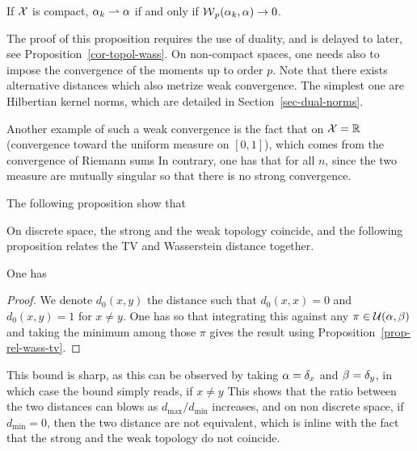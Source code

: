 \begin{prop}
	If $\mathcal{X}$ is compact, $\alpha_k \rightharpoonup \alpha$ if and only if $\operatorname{\mathcal{W}}_p(\alpha_k,\alpha) \rightarrow 0$. 
\end{prop}

The proof of this proposition requires the use of duality, and is delayed to later, see Proposition~\ref{cor-topol-wass}. 
On non-compact spaces, one needs also to impose the convergence of the moments up to order $p$.
%
Note that there exists alternative distances which also metrize weak convergence. The simplest one are Hilbertian kernel norms, which are detailed in Section~\ref{sec-dual-norms}.

Another example of such a weak convergence is the fact that on $\mathcal{X}=\mathbb{R}$
(convergence toward the uniform measure on $[0,1]$), which comes from the convergence of Riemann sums 
In contrary, one has that for all $n$, since the two measure are mutually singular
so that there is no strong convergence.

The following proposition show that 

On discrete space, the strong and the weak topology coincide, and the following proposition relates the TV and Wasserstein distance together. 

\begin{prop}
	One has
\end{prop}

\begin{proof}
	We denote $d_0(x,y)$ the distance such that $d_0(x,x)=0$ and $d_0(x,y)=1$ for $x \neq y$. One has 
	so that integrating this against any $\pi \in \mathcal{U}(\alpha,\beta)$ and taking the minimum among those $\pi$ gives the result using Proposition~\eqref{prop-rel-wass-tv}. 
\end{proof}

This bound is sharp, as this can be observed by taking $\alpha=\delta_{x}$ and $\beta=\delta_y$, in which case the bound simply reads, if $x \neq y$
%
This shows that the ratio between the two distances can blows as $d_{\max}/d_{\min}$ increases, and on non discrete space, if $d_{\min}=0$, then the two distance are not equivalent, which is inline with the fact that the strong and the weak topology do not coincide. 



